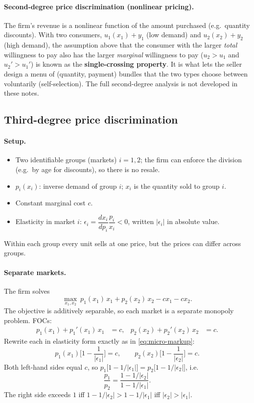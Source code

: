 \paragraph{Second-degree price discrimination (nonlinear pricing).} The firm's revenue is a nonlinear function of the amount purchased (e.g.\ quantity discounts). With two consumers, $u_1(x_1)+y_1$ (low demand) and $u_2(x_2)+y_2$ (high demand), the assumption above that the consumer with the larger \emph{total} willingness to pay also has the larger \emph{marginal} willingness to pay ($u_2>u_1$ and $u_2'>u_1'$) is known as the \textbf{single-crossing property}. It is what lets the seller design a menu of (quantity, payment) bundles that the two types choose between voluntarily (self-selection). The full second-degree analysis is not developed in these notes.

\subsection{Third-degree price discrimination }

\paragraph{Setup.}
\begin{itemize}
\item Two identifiable groups (markets) $i=1,2$; the firm can enforce the division (e.g.\ by age for discounts), so there is no resale.
\item $p_i(x_i)$: inverse demand of group $i$; $x_i$ is the quantity sold to group $i$.
\item Constant marginal cost $c$.
\item Elasticity in market $i$: $\epsilon_i=\dfrac{dx_i}{dp_i}\dfrac{p_i}{x_i}<0$, written $|\epsilon_i|$ in absolute value.
\end{itemize}
Within each group every unit sells at one price, but the prices can differ across groups.

\paragraph{Separate markets.} The firm solves
\[
\max_{x_1,x_2}\ p_1(x_1)\,x_1+p_2(x_2)\,x_2-cx_1-cx_2 .
\]
The objective is additively separable, so each market is a separate monopoly problem. FOCs:
\begin{align*}
p_1(x_1)+p_1'(x_1)\,x_1&=c, & p_2(x_2)+p_2'(x_2)\,x_2&=c .
\end{align*}
Rewrite each in elasticity form exactly as in \eqref{eq:micro-markup}:
\begin{equation}\label{eq:micro-3rd}
p_1(x_1)\Big[1-\frac{1}{|\epsilon_1|}\Big]=c,\qquad p_2(x_2)\Big[1-\frac{1}{|\epsilon_2|}\Big]=c .
\end{equation}
Both left-hand sides equal $c$, so $p_1\big[1-1/|\epsilon_1|\big]=p_2\big[1-1/|\epsilon_2|\big]$, i.e.
\[
\frac{p_1}{p_2}=\frac{1-1/|\epsilon_2|}{1-1/|\epsilon_1|}.
\]
The right side exceeds $1$ iff $1-1/|\epsilon_2|>1-1/|\epsilon_1|$ iff $|\epsilon_2|>|\epsilon_1|$.

